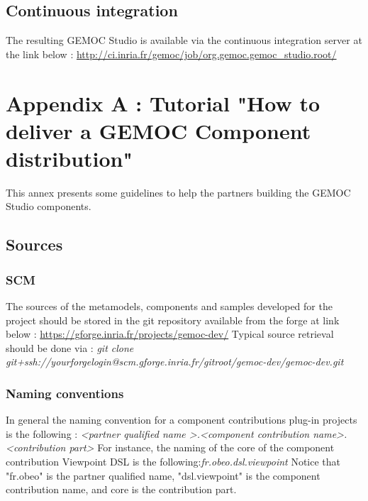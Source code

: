 \documentclass{gemoc} %
\begin{document}
\section{Continuous integration}
The resulting GEMOC Studio is available via the continuous integration server at the link below :
\newline
\url {http://ci.inria.fr/gemoc/job/org.gemoc.gemoc_studio.root/}


\newpage
\chapter{Appendix A : Tutorial "How to deliver a GEMOC Component distribution"}
This annex presents some guidelines to help the partners building the GEMOC Studio components.
\section{Sources}
\subsection{SCM}
The sources of the metamodels, components and samples developed for the project should be stored in the git repository available from the forge at link below :\newline
\url{https://gforge.inria.fr/projects/gemoc-dev/}
\newline\newline
Typical source retrieval should be done via :\newline
\textit{git clone git+ssh://yourforgelogin@scm.gforge.inria.fr/gitroot/gemoc-dev/gemoc-dev.git}
\subsection{Naming conventions}
In general the naming convention for a component contributions plug-in projects is the following :
\newline
\textit{\textless partner qualified name \textgreater.\textless component contribution name\textgreater .\textless contribution part\textgreater }
\newline\newline
For instance, the naming of the core of the component contribution Viewpoint DSL is the following:\textit{fr.obeo.dsl.viewpoint}
\newline
Notice that "fr.obeo" is the partner qualified name, "dsl.viewpoint" is the component contribution name, and core is the contribution part.
\newline
\end{document}
